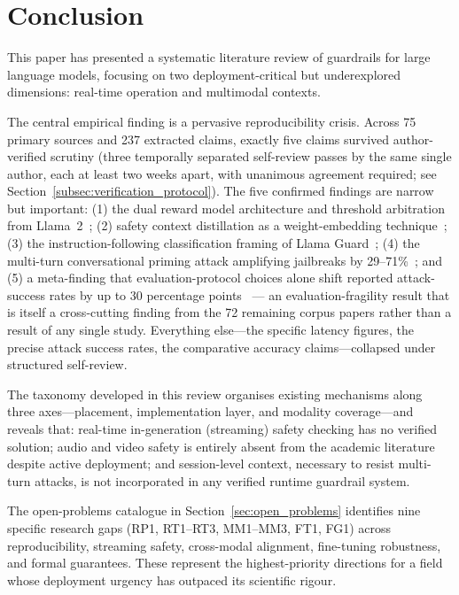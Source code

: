 \section{Conclusion}
\label{sec:conclusion}

This paper has presented a systematic literature review of guardrails for large
language models, focusing on two deployment-critical but underexplored dimensions:
real-time operation and multimodal contexts.

The central empirical finding is a pervasive reproducibility crisis.
Across 75 primary sources and 237 extracted claims, exactly five
claims survived author-verified scrutiny (three temporally separated self-review
passes by the same single author, each at least two weeks apart, with unanimous
agreement required; see Section~\ref{subsec:verification_protocol}).
The five confirmed findings are narrow but important: (1) the dual reward model
architecture and threshold arbitration from Llama~2~\cite{touvron2023llama2};
(2) safety context distillation as a weight-embedding technique~\cite{touvron2023llama2};
(3) the instruction-following classification framing of Llama Guard~\cite{inan2023llama};
(4) the multi-turn conversational priming attack amplifying jailbreaks by
29--71\%~\cite{russinovich2024greatescalation}; and (5) a meta-finding that
evaluation-protocol choices alone shift reported attack-success rates by up to
30 percentage points~\cite{li2024salad} --- an evaluation-fragility result that
is itself a cross-cutting finding from the 72 remaining corpus papers rather than
a result of any single study.
Everything else---the specific latency figures, the precise attack success rates,
the comparative accuracy claims---collapsed under structured self-review.

The taxonomy developed in this review organises existing mechanisms along three
axes---placement, implementation layer, and modality coverage---and reveals that:
real-time in-generation (streaming) safety checking has no verified solution;
audio and video safety is entirely absent from the academic literature despite
active deployment; and session-level context, necessary to resist multi-turn
attacks, is not incorporated in any verified runtime guardrail system.

The open-problems catalogue in Section~\ref{sec:open_problems} identifies nine
specific research gaps (RP1, RT1--RT3, MM1--MM3, FT1, FG1) across reproducibility,
streaming safety, cross-modal alignment, fine-tuning robustness, and formal
guarantees.
These represent the highest-priority directions for a field whose deployment
urgency has outpaced its scientific rigour.

